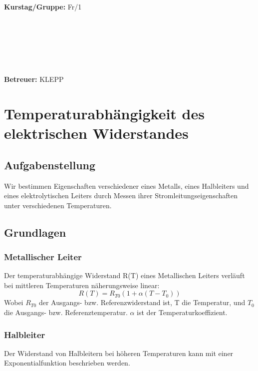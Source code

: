 \documentclass{article}
\begin{document}
\begin{verbatim}


\end{verbatim}
			\begin{flushleft}
			\textbf{\Large{Kurstag/Gruppe:}} \Large{Fr/1}
			\end{flushleft}

\begin{verbatim}






\end{verbatim}
			\begin{flushleft}
			\LARGE{\textbf{Betreuer:}}	\Large{KLEPP}	
			\end{flushleft}
\newpage	

\section{Temperaturabhängigkeit des elektrischen Widerstandes}

\subsection{Aufgabenstellung}
Wir bestimmen Eigenschaften verschiedener eines Metalls, eines Halbleiters und eines elektrolytischen Leiters durch Messen ihrer Stromleitungseigenschaften unter verschiedenen Temperaturen.
\subsection{Grundlagen}
\subsubsection*{Metallischer Leiter}
Der temperaturabhängige Widerstand R(T) eines Metallischen Leiters verläuft bei mittleren Temperaturen näherungsweise linear:
\begin{equation}
\label{MetallWiderstand}
R(T) = R_{T0} (1+ \alpha (T-T_0))
\end{equation}
Wobei $ R_{T0}$ der Ausgangs- bzw. Referenzwiderstand ist,
T die Temperatur, und 
$T_0$ die Ausgangs- bzw. Referenztemperatur. 
$\alpha$ ist der Temperaturkoeffizient.\\

\subsubsection*{Halbleiter}
Der Widerstand von Halbleitern bei höheren Temperaturen kann mit einer Exponentialfunktion beschrieben werden.
\end{document}
